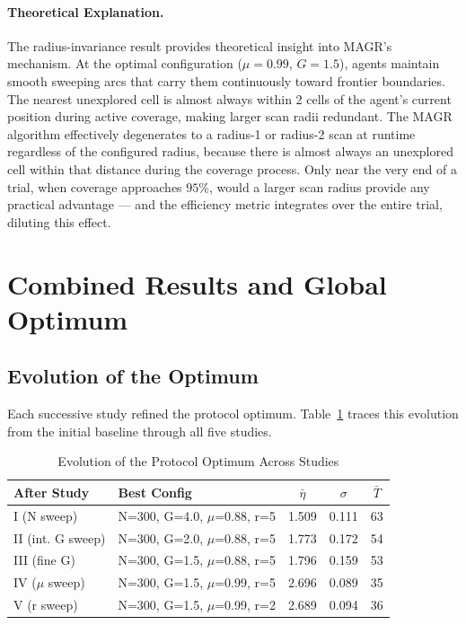 \documentclass[journal,compsoc]{IEEEtran}
\begin{document}
\paragraph{Theoretical Explanation.}
The radius-invariance result provides theoretical insight into MAGR's mechanism. At
the optimal configuration ($\mu=0.99$, $G=1.5$), agents maintain smooth sweeping arcs
that carry them continuously toward frontier boundaries. The nearest unexplored cell is
almost always within 2 cells of the agent's current position during active coverage,
making larger scan radii redundant. The MAGR algorithm effectively degenerates to a
radius-1 or radius-2 scan at runtime regardless of the configured radius, because
there is almost always an unexplored cell within that distance during the coverage
process. Only near the very end of a trial, when coverage approaches $95\%$, would
a larger scan radius provide any practical advantage --- and the efficiency metric
integrates over the entire trial, diluting this effect.

\section{Combined Results and Global Optimum}
\label{sec:combined}

\subsection{Evolution of the Optimum}

Each successive study refined the protocol optimum. Table~\ref{tab:evolution} traces
this evolution from the initial baseline through all five studies.

\begin{table}[H]
\renewcommand{\arraystretch}{1.3}
\caption{Evolution of the Protocol Optimum Across Studies}
\label{tab:evolution}
\centering
\begin{tabular}{llccc}
\hline
\textbf{After Study} & \textbf{Best Config} & $\bar{\eta}$ & $\sigma$ & $\bar{T}$ \\
\hline
I  (N sweep)      & N=300, G=4.0, $\mu$=0.88, r=5 & 1.509 & 0.111 & 63 \\
II (int. G sweep) & N=300, G=2.0, $\mu$=0.88, r=5 & 1.773 & 0.172 & 54 \\
III (fine G)      & N=300, G=1.5, $\mu$=0.88, r=5 & 1.796 & 0.159 & 53 \\
IV ($\mu$ sweep)      & N=300, G=1.5, $\mu$=0.99, r=5 & 2.696 & 0.089 & 35 \\
V  (r sweep)      & N=300, G=1.5, $\mu$=0.99, r=2 & 2.689 & 0.094 & 36 \\
\hline
\end{tabular}
\end{table}
\end{document}

